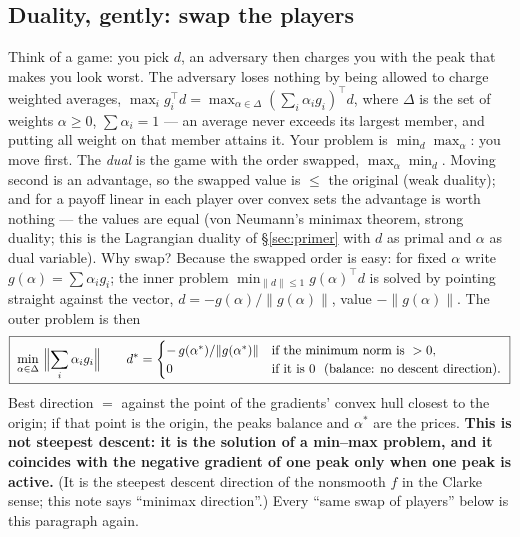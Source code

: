 \documentclass[11pt,a4paper]{article}
\newcommand{\T}{^{\!\top}}
\begin{document}
\subsection{Duality, gently: swap the players}
\label{sec:dual}
Think of a game: you pick $d$, an adversary then charges you with the peak that makes you
look worst.  The adversary loses nothing by being allowed to charge weighted averages,
$\max_ig_i\T d=\max_{\alpha\in\Delta}(\sum_i\alpha_ig_i)\T d$, where $\Delta$ is the set
of weights $\alpha\ge0$, $\sum\alpha_i=1$ --- an average never exceeds its largest member,
and putting all weight on that member attains it.  Your problem is
$\min_{d}\max_\alpha$: you move first.  The \emph{dual} is the game with the order
swapped, $\max_\alpha\min_d$.  Moving second is an advantage, so the swapped value is
$\le$ the original (weak duality); and for a payoff linear in each player over convex
sets the advantage is worth nothing --- the values are equal (von Neumann's minimax
theorem, strong duality; this is the Lagrangian duality of \S\ref{sec:primer} with $d$ as
primal and $\alpha$ as dual variable).  Why swap?  Because the swapped order is easy: for
fixed $\alpha$ write $g(\alpha)=\sum\alpha_ig_i$; the inner problem
$\min_{\|d\|\le1}g(\alpha)\T d$ is solved by pointing straight against the vector,
$d=-g(\alpha)/\|g(\alpha)\|$, value $-\|g(\alpha)\|$.  The outer problem is then
\[
\boxed{\;\min_{\alpha\in\Delta}\ \Bigl\|\sum_i\alpha_ig_i\Bigr\|
\qquad
d^\ast=\begin{cases}-\,g(\alpha^\ast)/\|g(\alpha^\ast)\| & \text{if the minimum norm is }>0,\\
0 & \text{if it is }0\ \ (\text{balance: no descent direction}).\end{cases}\;}
\]
Best direction $=$ against the point of the gradients' convex hull closest to the
origin; if that point is the origin, the peaks balance and $\alpha^\ast$ are the prices.
\textbf{This is not steepest descent: it is the solution of a min--max problem, and it
coincides with the negative gradient of one peak only when one peak is active.}  (It is
the steepest descent direction of the nonsmooth $f$ in the Clarke sense; this note says
``minimax direction''.)  Every ``same swap of players'' below is this paragraph again.
\end{document}
